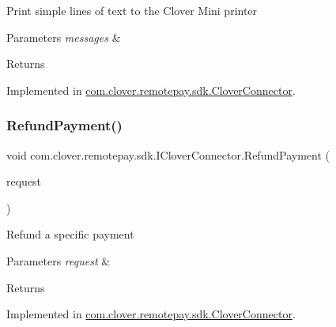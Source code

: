 Print simple lines of text to the Clover Mini printer 


\begin{DoxyParams}{Parameters}
{\em messages} & \\
\hline
\end{DoxyParams}
\begin{DoxyReturn}{Returns}

\end{DoxyReturn}


Implemented in \hyperlink{classcom_1_1clover_1_1remotepay_1_1sdk_1_1_clover_connector_a1601ef2709d1e2eb53fa92ff1ee46823}{com.\+clover.\+remotepay.\+sdk.\+Clover\+Connector}.

\mbox{\label{interfacecom_1_1clover_1_1remotepay_1_1sdk_1_1_i_clover_connector_aaa44684c7bf2c04b88ead61034c7c273}} 
\subsubsection{\texorpdfstring{Refund\+Payment()}{RefundPayment()}}
{\footnotesize\ttfamily void com.\+clover.\+remotepay.\+sdk.\+I\+Clover\+Connector.\+Refund\+Payment (\begin{DoxyParamCaption}\item[{\hyperlink{classcom_1_1clover_1_1remotepay_1_1sdk_1_1_refund_payment_request}{Refund\+Payment\+Request}}]{request }\end{DoxyParamCaption})}



Refund a specific payment 


\begin{DoxyParams}{Parameters}
{\em request} & \\
\hline
\end{DoxyParams}
\begin{DoxyReturn}{Returns}

\end{DoxyReturn}


Implemented in \hyperlink{classcom_1_1clover_1_1remotepay_1_1sdk_1_1_clover_connector_a55f368cbaa89e2a8c47da3ba4a3a80aa}{com.\+clover.\+remotepay.\+sdk.\+Clover\+Connector}.

